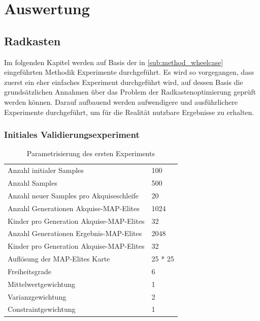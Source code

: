\section{Auswertung}

\subsection{Radkasten}

Im folgenden Kapitel werden auf Basis der in \ref{sub:method_wheelcase} eingeführten Methodik Experimente durchgeführt.
Es wird so vorgegangen, dass zuerst ein eher einfaches Experiment durchgeführt wird, auf dessen Basis die grundsätzlichen Annahmen über das Problem der Radkastenoptimierung geprüft werden können.
Darauf aufbauend werden aufwendigere und ausführlichere Experimente durchgeführt, um für die Realität nutzbare Ergebnisse zu erhalten.

\subsubsection{Initiales Validierungsexperiment}
\label{sub:exp1st}
\begin{table}[h]
	\centering
	\begin{tabularx}{.75\textwidth}{ll}\hline
		Anzahl initialer Samples & 100 \\
		Anzahl Samples & 500 \\
		Anzahl neuer Samples pro Akquiseschleife & 20 \\
		Anzahl Generationen Akquise-MAP-Elites & 1024 \\
		Kinder pro Generation Akquise-MAP-Elites & 32 \\
		Anzahl Generationen Ergebnis-MAP-Elites & 2048 \\
		Kinder pro Generation Akquise-MAP-Elites & 32 \\
		Auflösung der MAP-Elites Karte & 25 * 25  \\
		\hline
		Freiheitsgrade & 6 \\
		Mittelwertgewichtung & 1 \\
		Varianzgewichtung & 2 \\
		Constraintgewichtung & 1 \\
	\end{tabularx}
	\caption{Parametrisierung des ersten Experiments}
	\label{tab:param1st}
\end{table}

